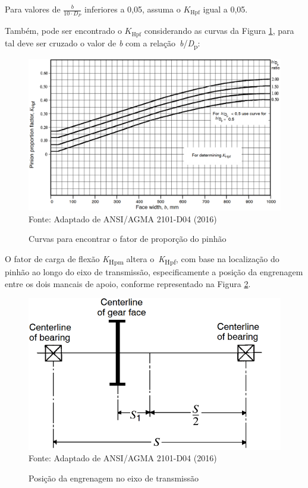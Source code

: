 \documentclass[12pt,a4paper]{article}
\begin{document}
Para valores de \(\frac{b}{10\cdot D_{P}}\) inferiores a 0,05, assuma o \(K_{\text{Hpf}}\) igual a 0,05.

Também, pode ser encontrado o \(K_{\text{Hpf}}\) considerando as curvas
da Figura {\ref{fig:10}}, para tal deve ser cruzado o
valor de \emph{b} com a relação~\emph{b}/\emph{D}\textsubscript{p}:

\begin{figure}[!htb]
    \centering
    \caption{Curvas para encontrar o fator de proporção do pinhão}
    \includegraphics[scale=0.55]{Imagens/Img10.png}\\
    {\footnotesize Fonte: Adaptado de ANSI/AGMA 2101-D04 (2016)}
    \label{fig:10}
\end{figure}

O fator de carga de flexão \emph{K}\textsubscript{Hpm} altera
o~\emph{K}\textsubscript{Hpf}, com base na localização do pinhão ao
longo do eixo de transmissão, especificamente a posição da engrenagem
entre os dois mancais de apoio, conforme representado na Figura
{\ref{fig:11}}.

\begin{figure}[!htb]
    \centering
    \caption{Posição da engrenagem no eixo de transmissão}
    \includegraphics[scale=0.9]{Imagens/Img11.png}\\
    {\footnotesize Fonte: Adaptado de ANSI/AGMA 2101-D04 (2016)}
    \label{fig:11}
\end{figure}
\end{document}
